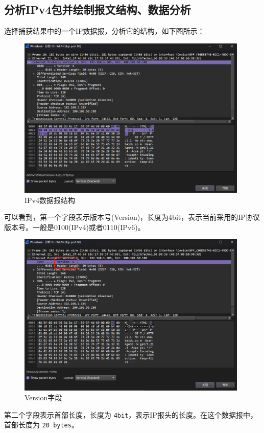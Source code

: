 \documentclass{article}
\begin{document}
	\subsection{分析IPv4包并绘制报文结构、数据分析}
	
	选择捕获结果中的一个IP数据报，分析它的结构，如下图所示：
	
	\begin{figure}[H]
		\centering
		\includegraphics[width=11cm]{images/4. IPv4数据报结构.jpg}
		\caption{IPv4数据报结构}
	\end{figure}
	
	可以看到，第一个字段表示版本号(Version)，长度为4bit，表示当前采用的IP协议版本号。一般是0100(IPv4)或者0110(IPv6)。
	
	\begin{figure}[H]
		\centering
		\includegraphics[width=11cm]{images/5. Version字段.jpg}
		\caption{Version字段}
	\end{figure}
	
	第二个字段表示首部长度，长度为 \texttt{4bit}，表示IP报头的长度。在这个数据报中，首部长度为 \texttt{20 bytes}。
	
\end{document}
